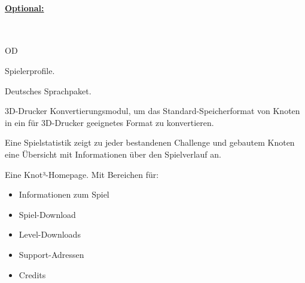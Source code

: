 %
%
\paragraph*{\underline{Optional:}}~\\


\begin{ids}{\gls{OD}}

	\id[200] Spielerprofile.
	
	\id[210] Deutsches Sprachpaket.
	
	\id[220] 3D-Drucker Konvertierungsmodul, um das Standard-Speicherformat von Knoten in ein für 3D-Drucker geeignetes Format zu konvertieren.
	
	\id[230] Eine Spielstatistik zeigt zu jeder bestandenen Challenge und gebautem Knoten eine Übersicht mit Informationen über den Spielverlauf an.
	
	\id[250] Eine Knot³-Homepage. Mit Bereichen für:
	
	\begin{itemize}
		
		\item Informationen zum Spiel
		\item Spiel-Download
		\item Level-Downloads
		\item Support-Adressen
		\item Credits
	
	\end{itemize}
	
\end{ids}


